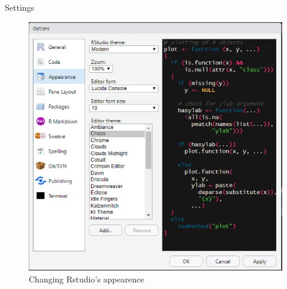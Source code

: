 \documentclass[ignorenonframetext,]{beamer}
\begin{document}
\begin{frame}{Settings}
\protect\hypertarget{settings-2}{}

\begin{figure}
   \includegraphics[scale = .35]{figures/Screenshot_4}
   \caption{Changing Rstudio's appearence}
\end{figure}

\end{frame}
\end{document}
